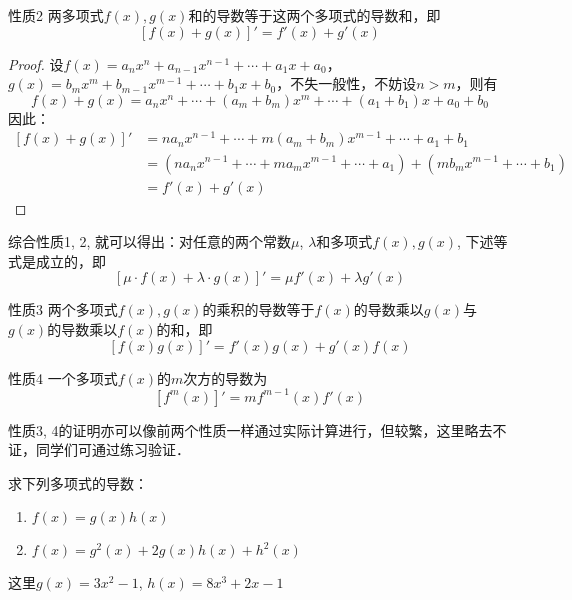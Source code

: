 \begin{blk}{性质2}
    两多项式$f(x),g(x)$和的导数等于这两个多项式的导数和，即
\[[f (x) +g (x) ]'=f' (x) +g' (x) \]  
\end{blk}  
 
\begin{proof}
设$f(x)=a_nx^n+a_{n-1}x^{n-1}+\cdots+a_1x+a_0$，$g(x)=b_mx^m+b_{m-1}x^{m-1}+\cdots+b_1x+b_0$，不失一般性，不妨设$n>m$，则有
\[f(x)+g(x)=a_nx^n+\cdots + (a_{m}+b_m)x^{m}+\cdots+(a_1+b_1)x+a_0+b_0\]
因此：
\[\begin{split}
    [f(x)+g(x)]'&=na_nx^{n-1}+\cdots + m(a_{m}+b_m)x^{m-1}+\cdots+a_1+b_1\\
    &=(na_nx^{n-1}+\cdots+ma_mx^{m-1}+\cdots +a_1)+(mb_mx^{m-1}+\cdots +b_1)\\
    &=f'(x)+g'(x)
\end{split}\]
\end{proof}  

综合性质1, 2, 就可以得出：对任意的两个常数$\mu$, $\lambda$和多项式$f(x),g(x)$, 下述等式是成立的，即
\[[\mu\cdot f (x) +\lambda\cdot g (x) ]'=\mu f' (x) +\lambda g' (x) \]

\begin{blk}{性质3}
两个多项式$f(x),g(x)$的乘积的导数等于$f(x)$的导数乘以$g(x)$与$g(x)$的导数乘以$f(x)$的和，即
\[[f (x) g (x) ]'=f' (x) g (x) +g' (x) f (x) \]
\end{blk}

\begin{blk}{性质4}
    一个多项式$f(x)$的$m$次方的导数为
\[[f^m (x) ] '= mf^{m-1} (x) f' (x) \]
\end{blk}

性质3, 4的证明亦可以像前两个性质一样通过实际计算进行，但较繁，这里略去不证，同学们可通过练习验证．

\begin{example}
求下列多项式的导数：
\begin{enumerate}
    \item $f(x)=g(x)h(x)$
    \item $f (x) =g^2 (x) +2g (x) h (x) +h^2 (x) $
\end{enumerate} 
这里$g(x)=3x^2-1$, $h (x) =8x^3+2x-1$
    \end{example}

